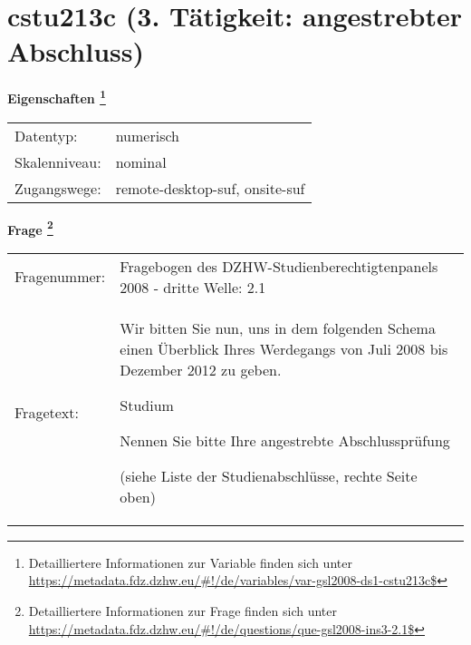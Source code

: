
    \setcounter{footnote}{0}

    \vspace*{-1.8cm}
	\section{cstu213c (3. Tätigkeit: angestrebter Abschluss)}
	\label{section:cstu213c}



    \vspace*{0.5cm}
    \noindent\textbf{Eigenschaften
	\footnote{Detailliertere Informationen zur Variable finden sich unter
		\url{https://metadata.fdz.dzhw.eu/\#!/de/variables/var-gsl2008-ds1-cstu213c$}}}\\
	\begin{tabularx}{\hsize}{@{}lX}
	Datentyp: & numerisch \\
	Skalenniveau: & nominal \\
	Zugangswege: &
	  remote-desktop-suf, 
	  onsite-suf
 \\
    \end{tabularx}



				\vspace*{0.5cm}
                \noindent\textbf{Frage
	                \footnote{Detailliertere Informationen zur Frage finden sich unter
		              \url{https://metadata.fdz.dzhw.eu/\#!/de/questions/que-gsl2008-ins3-2.1$}}}\\
				\begin{tabularx}{\hsize}{@{}lX}
					Fragenummer: &
					  Fragebogen des DZHW-Studienberechtigtenpanels 2008 - dritte Welle:
					  2.1
 \\
					Fragetext: & Wir bitten Sie nun, uns in dem folgenden Schema einen Überblick Ihres Werdegangs von Juli 2008 bis Dezember 2012 zu geben.\par  Studium\par  Nennen Sie bitte Ihre angestrebte Abschlussprüfung \par  (siehe Liste der Studienabschlüsse, rechte Seite oben) \\
				\end{tabularx}





